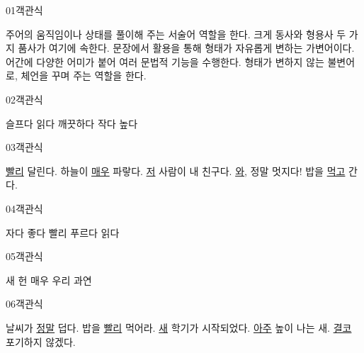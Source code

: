 \documentclass[fs9,seriesRus]{korfarm-base}
\begin{document}
\par\medskip
\kfBeginMC
\begin{kfQBlock}{01}{객관식}
\begin{kfChoices}
\kfChoice 주어의 움직임이나 상태를 풀이해 주는 서술어 역할을 한다.
\kfChoice 크게 동사와 형용사 두 가지 품사가 여기에 속한다.
\kfChoice 문장에서 활용을 통해 형태가 자유롭게 변하는 가변어이다.
\kfChoice 어간에 다양한 어미가 붙어 여러 문법적 기능을 수행한다.
\kfChoice 형태가 변하지 않는 불변어로, 체언을 꾸며 주는 역할을 한다.
\end{kfChoices}
\end{kfQBlock}
\begin{kfQBlock}{02}{객관식}
\begin{kfChoices}
\kfChoice 슬프다
\kfChoice 읽다
\kfChoice 깨끗하다
\kfChoice 작다
\kfChoice 높다
\end{kfChoices}
\end{kfQBlock}
\begin{kfQBlock}{03}{객관식}
\begin{kfChoices}
\kfChoice \uline{빨리} 달린다.
\kfChoice 하늘이 \uline{매우} 파랗다.
\kfChoice \uline{저} 사람이 내 친구다.
\kfChoice \uline{와}, 정말 멋지다!
\kfChoice 밥을 \uline{먹고} 간다.
\end{kfChoices}
\end{kfQBlock}
\begin{kfQBlock}{04}{객관식}
\begin{kfChoices}
\kfChoice 자다
\kfChoice 좋다
\kfChoice 빨리
\kfChoice 푸르다
\kfChoice 읽다
\end{kfChoices}
\end{kfQBlock}
\begin{kfQBlock}{05}{객관식}
\begin{kfChoices}
\kfChoice 새
\kfChoice 헌
\kfChoice 매우
\kfChoice 우리
\kfChoice 과연
\end{kfChoices}
\end{kfQBlock}
\begin{kfQBlock}{06}{객관식}
\begin{kfChoices}
\kfChoice 날씨가 \uline{정말} 덥다.
\kfChoice 밥을 \uline{빨리} 먹어라.
\kfChoice \uline{새} 학기가 시작되었다.
\kfChoice \uline{아주} 높이 나는 새.
\kfChoice \uline{결코} 포기하지 않겠다.
\end{kfChoices}
\end{kfQBlock}
\end{document}

